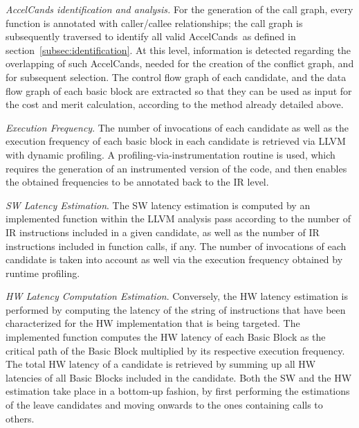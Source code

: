 \documentclass[]{usiinfthesis}
\newcommand{\candidates}{{AccelCand}s}
\begin{document}
\emph{AccelCands identification and analysis.} For the generation of
the call graph, every function is annotated with caller/callee relationships; 
the call graph is subsequently traversed to identify all valid \candidates\ as 
defined in section~\ref{subsec:identification}. At this level, information is 
detected regarding the overlapping of such \candidates, needed for the creation 
of the conflict graph, and for subsequent selection. The control flow graph of 
each candidate, and the data flow graph of each basic block are extracted so 
that they can be used as input for the cost and merit calculation, according to 
the method already detailed above.\par

\emph{Execution Frequency}.  The number of invocations of each
candidate as well as the execution frequency of each basic block in
each candidate is retrieved via LLVM with dynamic profiling. A
profiling-via-instrumentation routine is used, which requires the generation
of an instrumented version of the code, and then enables the obtained
frequencies to be annotated back to the IR level.\par

\emph{SW Latency Estimation}. The SW latency estimation is 
computed by an implemented function within the LLVM analysis pass
according to the number of IR instructions included in a given candidate,
as well as the number of IR instructions included in function calls, if
any.
The number of invocations of each candidate is taken into account 
as well via the execution frequency obtained by runtime profiling.
\par

\emph{HW Latency Computation Estimation}. Conversely, the HW latency
estimation is performed by computing the latency of the string of
instructions that have been characterized for the HW implementation
that is being targeted. The implemented function computes the HW
latency of each Basic Block as the critical path of the Basic Block
multiplied by its respective execution frequency. The total HW latency
of a candidate is retrieved by summing up all HW latencies of all Basic 
Blocks included in the candidate. 
Both the SW and the HW estimation take place in a bottom-up fashion,
by first performing the estimations of the leave candidates and moving
onwards to the ones containing calls to others.\par
\end{document}
